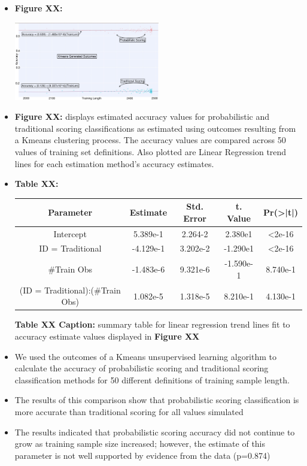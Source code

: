 \documentclass[12pt,]{article}
\begin{document}
\begin{itemize}
\item
  \textbf{Figure XX:}

  \begin{center}
  \includegraphics[width=0.5\textwidth]{KMeansResultsGraph.jpeg}
  \end{center}
\item
  \textbf{Figure XX:} displays estimated accuracy values for
  probabilistic and traditional scoring classifications as estimated
  using outcomes resulting from a Kmeans clustering process. The
  accuracy values are compared across 50 values of training set
  definitions. Also plotted are Linear Regression trend lines for each
  estimation method's accuracy estimates.
\item
  \textbf{Table XX:}

  \begin{center}
  \begin{tabular}{|c|c|c|c|c|}
  \hline
  Parameter                      & Estimate  & Std. Error & t. Value  & Pr(>|t|) \\
  \hline
  \hline
  Intercept                      &  5.389e-1 &  2.264-2  &  2.380e1  & <2e-16   \\
  \hline
  ID = Traditional               & -4.129e-1 &  3.202e-2  & -1.290e1  & <2e-16 \\
  \hline
  \#Train Obs                    &  -1.483e-6 &  9.321e-6  &  -1.590e-1  & 8.740e-1 \\
  \hline
  (ID = Traditional):(\#Train Obs) &  1.082e-5 &  1.318e-5  &  8.210e-1 & 4.130e-1 \\
  \hline
  \end{tabular}
  \end{center}

  \textbf{Table XX Caption:} summary table for linear regression trend
  lines fit to accuracy estimate values displayed in \textbf{Figure XX}
\item
  We used the outcomes of a Kmeans unsupervised learning algorithm to
  calculate the accuracy of probabilistic scoring and traditional
  scoring classification methods for 50 different definitions of
  training sample length.
\item
  The results of this comparison show that probabilistic scoring
  classification is more accurate than traditional scoring for all
  values simulated
\item
  The results indicated that probabilistic scoring accuracy did not
  continue to grow as training sample size increased; however, the
  estimate of this parameter is not well supported by evidence from the
  data (p=0.874)
\end{itemize}
\end{document}
